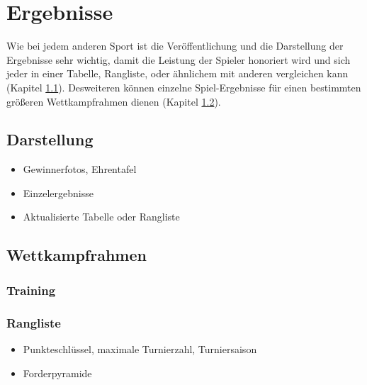 \section{Ergebnisse}
\label{turniere:ergebnisse}

Wie bei jedem anderen Sport ist die Veröffentlichung und die Darstellung der Ergebnisse sehr wichtig, damit die Leistung der Spieler honoriert wird und sich jeder in einer Tabelle, Rangliste, oder ähnlichem mit anderen vergleichen kann (Kapitel \ref{turniere:ergebnisse:formate}). 
Desweiteren können einzelne Spiel-Ergebnisse für einen bestimmten größeren Wettkampfrahmen dienen (Kapitel \ref{turniere:ergebnisse:rahmen}).

\subsection{Darstellung}
\label{turniere:ergebnisse:formate}

\begin{itemize}
\item Gewinnerfotos, Ehrentafel
\item Einzelergebnisse
\item Aktualisierte Tabelle oder Rangliste  
\end{itemize}

\subsection{Wettkampfrahmen}
\label{turniere:ergebnisse:rahmen}

\subsubsection{Training}
\label{turniere:ergebnisse:rahmen:training}

\subsubsection{Rangliste}
\label{turniere:ergebnisse:rahmen:rangliste}

\begin{itemize}
\item Punkteschlüssel, maximale Turnierzahl, Turniersaison
\item Forderpyramide
\end{itemize}

